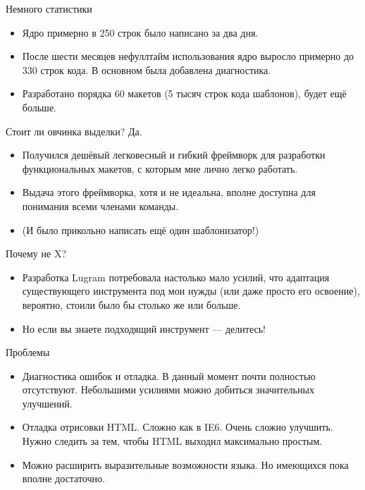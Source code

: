 \documentclass[aspectratio=169,handout,bigger]{beamer}
\begin{document}
\begin{frame}{Немного статистики}
  \begin{itemize}
    \item Ядро примерно в 250 строк было написано за два дня.
    \item После шести месяцев нефуллтайм использования ядро выросло
          примерно до 330 строк кода. В основном была добавлена диагностика.
    \item Разработано порядка 60 макетов (5 тысяч строк кода шаблонов),
          будет ещё больше.
  \end{itemize}
\end{frame}


\begin{frame}{Стоит ли овчинка выделки?}
  Да.
  \begin{itemize}
    \item Получился дешёвый легковесный и гибкий фреймворк
          для разработки функциональных макетов,
          с которым мне лично легко работать.
    \item Выдача этого фреймворка, хотя и не идеальна,
          вполне доступна для понимания всеми членами команды.
    \item (И было прикольно написать ещё один шаблонизатор!)
  \end{itemize}
\end{frame}


\begin{frame}{Почему не X?}
  \begin{itemize}
    \item Разработка Lugram потребовала настолько мало усилий,
          что адаптация существующего инструмента под мои нужды
          (или даже просто его освоение), вероятно,
          стоили было бы столько же или больше.
    \item Но если вы знаете подходящий инструмент --- делитесь!
  \end{itemize}
\end{frame}


\begin{frame}{Проблемы}
  \begin{itemize}
    \item Диагностика ошибок и отладка.
          В данный момент почти полностью отсутствуют.
          Небольшими усилиями можно добиться значительных улучшений.
    \item Отладка отрисовки HTML. Сложно как в IE6. Очень сложно улучшить.
          Нужно следить за тем, чтобы HTML выходил максимально простым.
    \item Можно расширить выразительные возможности языка.
          Но имеющихся пока вполне достаточно.
  \end{itemize}
\end{frame}
\end{document}
